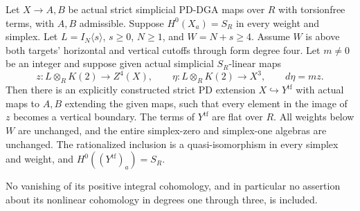 \begin{theorem}
\label{AT16}
Let $X\to A,B$ be actual strict simplicial PD-DGA maps
over $R$ with torsionfree terms, with $A,B$ admissible.
Suppose $H^0(X_a)=S_R$ in every weight and simplex.
Let $L=I_N\langle s\rangle$, $s\geq0$, $N\geq1$,
and $W=N+s\geq4$.
Assume $W$ is above both targets' horizontal and
vertical cutoffs through form degree four.
Let $m\ne0$ be an integer and suppose given actual
simplicial $S_R$-linear maps
\[
 z:L\otimes_R K(2)\to Z^4(X),\qquad
 \eta:L\otimes_R K(2)\to X^3,\qquad d\eta=mz.
 \tag{AT.74}
\]
Then there is an explicitly constructed strict PD
extension $X\hookrightarrow Y^{\mathrm{tf}}$ with
actual maps to $A,B$ extending the given maps,
such that every element in the image of $z$ becomes
a vertical boundary.
The terms of $Y^{\mathrm{tf}}$ are flat over $R$.
All weights below $W$ are unchanged, and the entire
simplex-zero and simplex-one algebras are unchanged.
The rationalized inclusion is a quasi-isomorphism
in every simplex and weight, and
$H^0((Y^{\mathrm{tf}})_a)=S_R$.

No vanishing of its positive integral cohomology,
and in particular no assertion about its nonlinear
cohomology in degrees one through three, is included.
\end{theorem}

